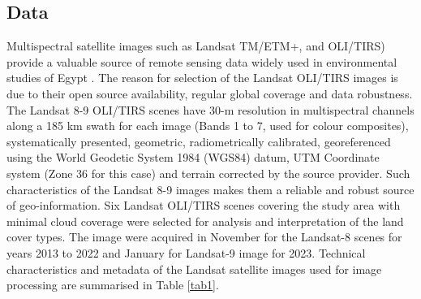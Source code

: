 \documentclass[information,article,submit,pdftex,moreauthors]{Definitions/mdpi}
\begin{document}
\subsection{Data}

Multispectral satellite images such as Landsat TM/ETM+, and OLI/TIRS) provide a valuable source of remote sensing data widely used in environmental studies of Egypt \cite{Elfadaly,Sultanetal1986,Sultanetal1987}. The reason for selection of the Landsat OLI/TIRS images is due to their open source availability, regular global coverage and data robustness. The Landsat 8-9 OLI/TIRS scenes have 30-m resolution in multispectral channels along a 185 km swath for each image (Bands 1 to 7, used for colour composites), systematically presented, geometric, radiometrically calibrated, georeferenced using the World Geodetic System 1984 (WGS84) datum, UTM Coordinate system (Zone 36 for this case) and terrain corrected by the source provider. Such characteristics of the Landsat 8-9 images makes them a reliable and robust source of geo-information. Six Landsat OLI/TIRS scenes covering the study area with minimal cloud coverage were selected for analysis and interpretation of the land cover types. The image were acquired in November for the Landsat-8 scenes for years 2013 to 2022 and January for Landsat-9 image for 2023. Technical characteristics and metadata of the Landsat satellite images used for image processing are summarised in Table \ref{tab1}. 
\end{document}
